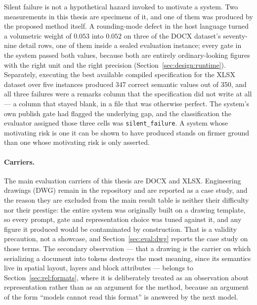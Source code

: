 Silent failure is not a hypothetical hazard invoked to motivate a system. Two measurements
in this thesis are specimens of it, and one of them was produced by the proposed method
itself. A rounding-mode defect in the host language turned a volumetric weight of $0.053$
into $0.052$ on three of the DOCX dataset's seventy-nine detail rows, one of them inside a
sealed evaluation instance; every gate in the system passed both values, because both are
entirely ordinary-looking figures with the right unit and the right precision
(Section~\ref{sec:design:runtime}). Separately, executing the best available compiled
specification for the XLSX dataset over five instances produced 347 correct semantic values
out of 350, and all three failures were a remarks column that the specification did not
write at all --- a column that stayed blank, in a file that was otherwise perfect. The
system's own publish gate had flagged the underlying gap, and the classification the
evaluator assigned those three cells was \texttt{silent\_failure}. A system whose motivating
risk is one it can be shown to have produced stands on firmer ground than one whose
motivating risk is only asserted.

\paragraph{Carriers.}
The main evaluation carriers of this thesis are DOCX and XLSX. Engineering drawings (DWG)
remain in the repository and are reported as a case study, and the reason they are excluded
from the main result table is neither their difficulty nor their prestige: the entire system
was originally built on a drawing template, so every prompt, gate and representation choice
was tuned against it, and any figure it produced would be contaminated by construction. That
is a validity precaution, not a showcase, and Section~\ref{sec:eval:dwg} reports the case
study on those terms. The secondary observation --- that a drawing is the carrier on which
serializing a document into tokens destroys the most meaning, since its semantics live in
spatial layout, layers and block attributes --- belongs to Section~\ref{sec:rel:formats},
where it is deliberately treated as an observation about representation rather than as an
argument for the method, because an argument of the form ``models cannot read this format''
is answered by the next model.

